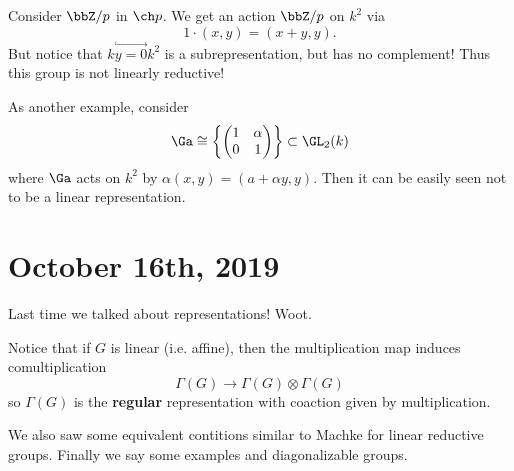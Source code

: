 \documentclass[12pt]{article}
\begin{document}
Consider $\bbZ/p$ in $\ch p$. We get an action $\bbZ/p$ on $k^2$ via 
\[1\cdot(x,y)=(x+y,y).\]
But notice that $k\stackrel{\hookrightarrow}{y=0}k^2$ is a subrepresentation, but has no complement! Thus this group is not linearly reductive!

\brk

As another example, consider
\[\Ga\cong\left\{\begin{pmatrix}
	1 & \alpha \\ 0 & 1
\end{pmatrix}\right\}
\subset\GL_2(k)\]
where $\Ga$ acts on $k^2$ by $\alpha(x,y)=(a+\alpha y,y)$. Then it can be easily seen not to be a linear representation.

\section{October 16th, 2019}
Last time we talked about representations! Woot.

Notice that if $G$ is linear (i.e. affine), then the multiplication map induces comultiplication 
\[\Gamma(G)\to \Gamma(G)\otimes\Gamma(G)\]
so $\Gamma(G)$ is the \textbf{regular} representation with coaction given by multiplication.

We also saw some equivalent contitions similar to Machke for linear reductive groups. Finally we say some examples and diagonalizable groups.
\end{document}
